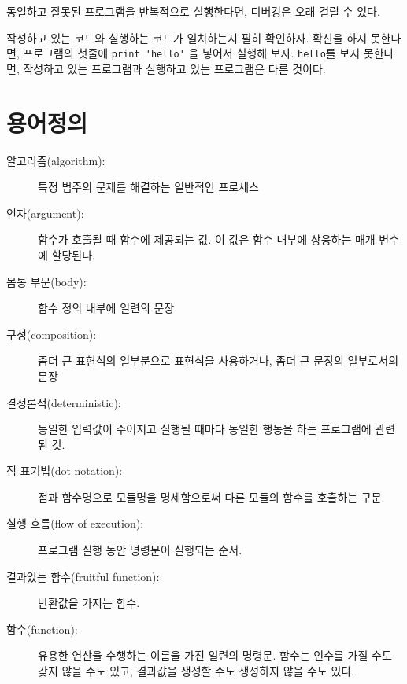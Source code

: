 동일하고 잘못된 프로그램을 반복적으로 실행한다면, 디버깅은 오래 걸릴 수 있다.

작성하고 있는 코드와 실행하는 코드가 일치하는지 필히 확인하자. 
확신을 하지 못한다면, 프로그램의 첫줄에 \verb"print 'hello'" 을 넣어서 실행해 보자.
\verb"hello"를 보지 못한다면, 작성하고 있는 프로그램과 실행하고 있는 프로그램은 다른 것이다.


\section{용어정의}

\begin{description}

\item[알고리즘(algorithm):] 특정 범주의 문제를 해결하는 일반적인 프로세스

\item[인자(argument):] 함수가 호출될 때 함수에 제공되는 값. 이 값은 함수 내부에 상응하는 매개 변수에 할당된다.

\item[몸통 부문(body):] 함수 정의 내부에 일련의 문장

\item[구성(composition):] 
좀더 큰 표현식의 일부분으로 표현식을 사용하거나, 좀더 큰 문장의 일부로서의 문장

\item[결정론적(deterministic):] 동일한 입력값이 주어지고 실행될 때마다 동일한 행동을 하는 프로그램에 관련된 것.

\item[점 표기법(dot notation):] 점과 함수명으로 모듈명을 명세함으로써 다른 모듈의 함수를 호출하는 구문.

\item[실행 흐름(flow of execution):] 프로그램 실행 동안 명령문이 실행되는 순서.

\item[결과있는 함수(fruitful function):] 반환값을 가지는 함수.

\item[함수(function):] 유용한 연산을 수행하는 이름을 가진 일련의 명령문.
함수는 인수를 가질 수도 갖지 않을 수도 있고, 결과값을 생성할 수도 생성하지 않을 수도 있다.


\end{description}

